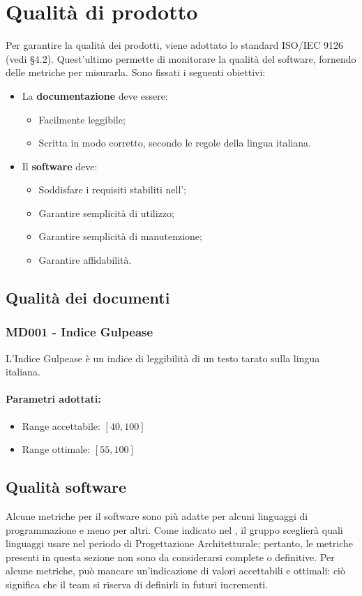 \section{Qualità di prodotto}
Per garantire la qualità dei prodotti, viene adottato lo standard 
ISO/IEC 9126 (vedi \NdP \space §4.2). Quest'ultimo permette di monitorare 
la qualità del software, fornendo delle metriche per misurarla.\newline
Sono fissati i seguenti obiettivi:
\begin{itemize}
	\item La \textbf{documentazione} deve essere:
		\begin{itemize}
			\item Facilmente leggibile;
			\item Scritta in modo corretto, secondo le regole della lingua italiana.
		\end{itemize}
	\item Il \textbf{software} deve:
		\begin{itemize}
			\item Soddisfare i requisiti stabiliti nell'\AdR ;
			\item Garantire semplicità di utilizzo;			
			\item Garantire semplicità di manutenzione;
			\item Garantire affidabilità.
		\end{itemize}
		
\end{itemize}
\subsection{Qualità dei documenti}


\subsubsection{MD001 - Indice Gulpease}\mbox{}
L'Indice Gulpease è un indice di leggibilità di un testo tarato sulla lingua italiana. 
\paragraph{Parametri adottati:}
\begin{itemize}
	\item Range accettabile: $[40 , 100]$
	\item Range ottimale: $[55 , 100]$
\end{itemize}

\subsection{Qualità software}
Alcune metriche per il software sono più adatte per alcuni linguaggi di programmazione e meno per altri. Come indicato nel \PdP , il gruppo \gruppo \space sceglierà quali linguaggi usare nel periodo di Progettazione Architetturale; pertanto, le metriche presenti in questa sezione non sono da considerarsi complete o definitive.\newline
Per alcune metriche, può mancare un'indicazione di valori accettabili e ottimali: ciò significa che il team si riserva di definirli in futuri incrementi.

